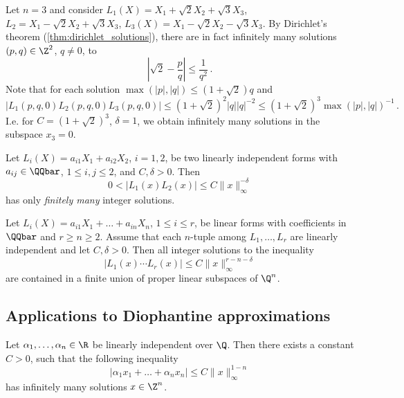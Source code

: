 \begin{exmp*}
	Let \( n = 3 \) and consider \( L_1(X) = X_1 + \sqrt{2}X_2 + \sqrt{3}X_3 \), \( L_2 = X_1 - \sqrt{2}X_2 + \sqrt{3}X_3 \), \( L_3(X) = X_1 - \sqrt{2}X_2 - \sqrt{3}X_3 \).
	By Dirichlet's theorem (\ref{thm:dirichlet_solutions}), there are in fact infinitely many solutions \( (p,q) \in \Z^2 \), \( q \neq 0 \), to
	\[ \left| \sqrt{2} - \frac{p}{q} \right| \leq \frac{1}{q^2} \,. \]
	Note that for each solution \( \max(|p|, |q|) \leq (1 + \sqrt{2})q \) and
	\[ \big| L_1(p,q,0) L_2(p,q,0) L_3(p,q,0) \big| \leq (1+\sqrt{2})^2 |q| |q|^{-2} \leq (1+\sqrt{2})^3 \max(|p|, |q|)^{-1} \,. \]
	I.e. for \( C = (1 + \sqrt{2})^3 \), \( \delta = 1 \), we obtain infinitely many solutions in the subspace \( x_3 = 0 \).
\end{exmp*}

\begin{lem}
	Let \( L_i(X) = a_{i1}X_1 + a_{i2}X_2 \), \( i = 1,2 \), be two linearly independent forms with \( a_{ij} \in \QQbar \), \( 1 \leq i,j \leq 2 \), and \( C,\delta > 0 \).
	Then
	\[ 0 < \big| L_1(x) L_2(x) \big| \leq C \|x\|_\infty^{-\delta} \]
	has only \emph{finitely many} integer solutions.
\end{lem}

\begin{thm}
	Let \( L_i(X) = a_{i1}X_1 + \dots + a_{in}X_n \), \( 1 \leq i \leq r \), be linear forms with coefficients in \( \QQbar \) and \( r \geq n \geq 2 \).
	Assume that each \( n \)-tuple among \( L_1, \dotsc, L_r \) are linearly independent and let \( C, \delta > 0 \).
	Then all integer solutions to the inequality 
	\[ \big| L_1(x) \dotsm L_r(x) \big| \leq C \|x\|_\infty^{r-n-\delta} \]
	are contained in a finite union of proper linear subspaces of \( \Q^n \).
\end{thm}

\subsection*{Applications to Diophantine approximations}

\begin{lem}
	Let \( \alpha_1, \dotsc, \alpha_n \in \R \) be linearly independent over \( \Q \).
	Then there exists a constant \( C > 0 \), such that the following inequality
	\[ \big| \alpha_1 x_1 + \dots + \alpha_n x_n \big| \leq C \|x\|_\infty^{1-n} \]
	has infinitely many solutions \( x \in \Z^n \).
\end{lem}

